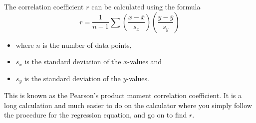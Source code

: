 The correlation coefficient $r$ can be calculated using the formula
\begin{equation*}
 r = \frac{1}{n-1}\sum{\left(\frac{x-\bar{x}}{s_x}\right)\left(\frac{y-\bar{y}}{s_y}\right)}
\end{equation*}
\begin{itemize}
\item where $n$ is the number of data points,
\item $s_x$ is the standard deviation of the $x$-values and
\item $s_y$ is the standard deviation of the $y$-values.
\end{itemize}

This is known as the Pearson's product moment correlation coefficient. It is a long calculation and much easier to do on the calculator where you simply follow the procedure for the regression equation, and go on to find $r$.

